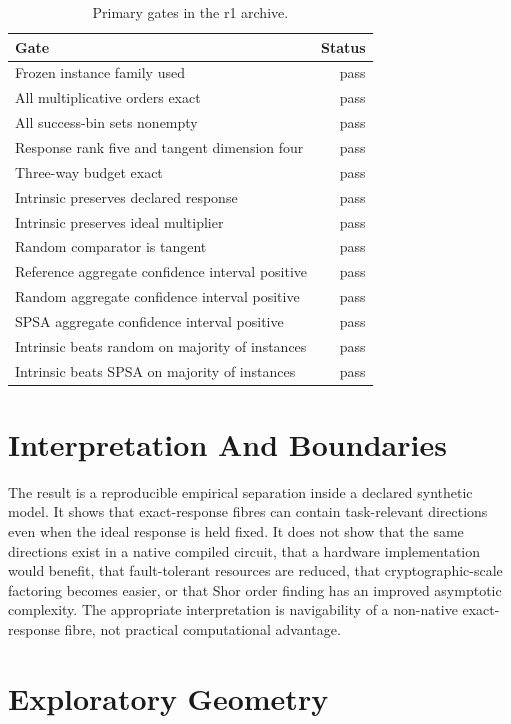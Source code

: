 \documentclass[11pt]{article}
\begin{document}
\begin{table}[h]
\centering
\caption{Primary gates in the r1 archive.}
\label{tab:gates}
\begin{tabular}{lr}
\toprule
Gate & Status\\
\midrule
Frozen instance family used & pass\\
All multiplicative orders exact & pass\\
All success-bin sets nonempty & pass\\
Response rank five and tangent dimension four & pass\\
Three-way budget exact & pass\\
Intrinsic preserves declared response & pass\\
Intrinsic preserves ideal multiplier & pass\\
Random comparator is tangent & pass\\
Reference aggregate confidence interval positive & pass\\
Random aggregate confidence interval positive & pass\\
SPSA aggregate confidence interval positive & pass\\
Intrinsic beats random on majority of instances & pass\\
Intrinsic beats SPSA on majority of instances & pass\\
\bottomrule
\end{tabular}
\end{table}

\section{Interpretation And Boundaries}

The result is a reproducible empirical separation inside a declared synthetic
model.  It shows that exact-response fibres can contain task-relevant
directions even when the ideal response is held fixed.  It does not show that
the same directions exist in a native compiled circuit, that a hardware
implementation would benefit, that fault-tolerant resources are reduced, that
cryptographic-scale factoring becomes easier, or that Shor order finding has
an improved asymptotic complexity.  The appropriate interpretation is
navigability of a non-native exact-response fibre, not practical computational
advantage.

\section{Exploratory Geometry}
\end{document}
